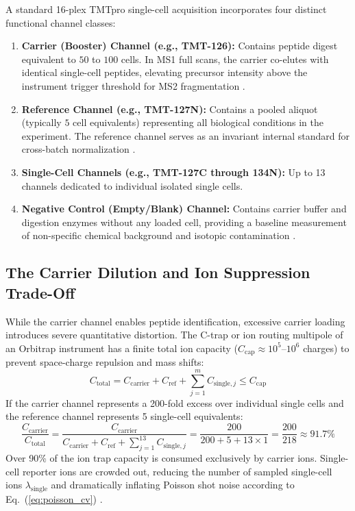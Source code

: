 \documentclass[11pt,twoside,openright]{book}
\begin{document}
A standard 16-plex TMTpro single-cell acquisition incorporates four distinct functional channel classes:
\begin{enumerate}
    \item \textbf{Carrier (Booster) Channel (e.g., TMT-126):} Contains peptide digest equivalent to $50$ to $100$ cells. In MS1 full scans, the carrier co-elutes with identical single-cell peptides, elevating precursor intensity above the instrument trigger threshold for MS2 fragmentation \cite{slavov2021scope2}.
    \item \textbf{Reference Channel (e.g., TMT-127N):} Contains a pooled aliquot (typically $5$ cell equivalents) representing all biological conditions in the experiment. The reference channel serves as an invariant internal standard for cross-batch normalization \cite{petelski2021multiplexed}.
    \item \textbf{Single-Cell Channels (e.g., TMT-127C through 134N):} Up to 13 channels dedicated to individual isolated single cells.
    \item \textbf{Negative Control (Empty/Blank) Channel:} Contains carrier buffer and digestion enzymes without any loaded cell, providing a baseline measurement of non-specific chemical background and isotopic contamination \cite{vanderaa2021scp}.
\end{enumerate}

\subsection{The Carrier Dilution and Ion Suppression Trade-Off}

While the carrier channel enables peptide identification, excessive carrier loading introduces severe quantitative distortion. The C-trap or ion routing multipole of an Orbitrap instrument has a finite total ion capacity ($C_{\text{cap}} \approx 10^5$--$10^6$ charges) to prevent space-charge repulsion and mass shifts:
\begin{equation}
C_{\text{total}} = C_{\text{carrier}} + C_{\text{ref}} + \sum_{j=1}^{m} C_{\text{single},j} \le C_{\text{cap}}
\end{equation}
If the carrier channel represents a 200-fold excess over individual single cells and the reference channel represents 5 single-cell equivalents:
\begin{equation}
\label{eq:carrier_capacity_share}
\frac{C_{\text{carrier}}}{C_{\text{total}}} = \frac{C_{\text{carrier}}}{C_{\text{carrier}} + C_{\text{ref}} + \sum_{j=1}^{13} C_{\text{single},j}} = \frac{200}{200 + 5 + 13 \times 1} = \frac{200}{218} \approx 91.7\%
\end{equation}
Over 90\% of the ion trap capacity is consumed exclusively by carrier ions. Single-cell reporter ions are crowded out, reducing the number of sampled single-cell ions $\lambda_{\text{single}}$ and dramatically inflating Poisson shot noise according to Eq.~(\ref{eq:poisson_cv}) \cite{cheung2021carrier, sielaff2023evaluation}.
\end{document}
